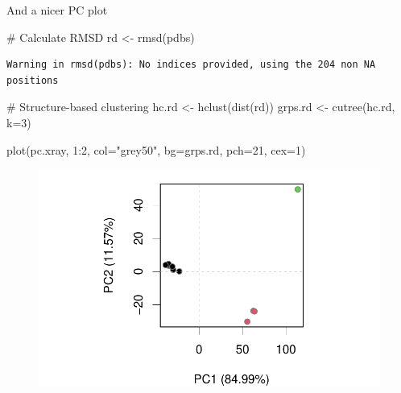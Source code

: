 \documentclass[
  letterpaper,
  DIV=11,
  numbers=noendperiod]{scrartcl}
\newenvironment{Shaded}{\begin{snugshade}}{\end{snugshade}}
\newcommand{\AttributeTok}[1]{\textcolor[rgb]{0.40,0.45,0.13}{#1}}
\newcommand{\CommentTok}[1]{\textcolor[rgb]{0.37,0.37,0.37}{#1}}
\newcommand{\DecValTok}[1]{\textcolor[rgb]{0.68,0.00,0.00}{#1}}
\newcommand{\FunctionTok}[1]{\textcolor[rgb]{0.28,0.35,0.67}{#1}}
\newcommand{\NormalTok}[1]{\textcolor[rgb]{0.00,0.23,0.31}{#1}}
\newcommand{\OtherTok}[1]{\textcolor[rgb]{0.00,0.23,0.31}{#1}}
\newcommand{\SpecialCharTok}[1]{\textcolor[rgb]{0.37,0.37,0.37}{#1}}
\newcommand{\StringTok}[1]{\textcolor[rgb]{0.13,0.47,0.30}{#1}}
\begin{document}
And a nicer PC plot

\begin{Shaded}
\begin{Highlighting}[]
\CommentTok{\# Calculate RMSD}
\NormalTok{rd }\OtherTok{\textless{}{-}} \FunctionTok{rmsd}\NormalTok{(pdbs)}
\end{Highlighting}
\end{Shaded}

\begin{verbatim}
Warning in rmsd(pdbs): No indices provided, using the 204 non NA positions
\end{verbatim}

\begin{Shaded}
\begin{Highlighting}[]
\CommentTok{\# Structure{-}based clustering}
\NormalTok{hc.rd }\OtherTok{\textless{}{-}} \FunctionTok{hclust}\NormalTok{(}\FunctionTok{dist}\NormalTok{(rd))}
\NormalTok{grps.rd }\OtherTok{\textless{}{-}} \FunctionTok{cutree}\NormalTok{(hc.rd, }\AttributeTok{k=}\DecValTok{3}\NormalTok{)}

\FunctionTok{plot}\NormalTok{(pc.xray, }\DecValTok{1}\SpecialCharTok{:}\DecValTok{2}\NormalTok{, }\AttributeTok{col=}\StringTok{"grey50"}\NormalTok{, }\AttributeTok{bg=}\NormalTok{grps.rd, }\AttributeTok{pch=}\DecValTok{21}\NormalTok{, }\AttributeTok{cex=}\DecValTok{1}\NormalTok{)}
\end{Highlighting}
\end{Shaded}

\begin{figure}[H]

{\centering \includegraphics{Class11INCLASS_files/figure-pdf/unnamed-chunk-13-1.pdf}

}

\end{figure}
\end{document}
